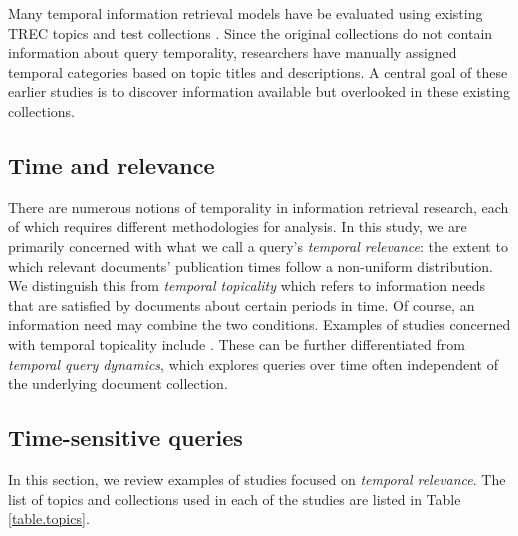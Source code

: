 \documentclass{asist}
\begin{document}
Many temporal information retrieval models have be evaluated using existing TREC topics and test collections \cite{Li2003, Jones2007, Efron2011, Dakka2012, Peetz2013a}. Since the original collections do not contain information about query temporality, researchers have manually assigned temporal categories  based on topic titles and descriptions.  A central goal of these earlier studies is to discover information available but overlooked in these existing collections.


\subsection{Time and relevance}

There are numerous notions of temporality in information retrieval research, each of which requires different methodologies for analysis. In this study, we are primarily concerned with what we call a query's \emph{temporal relevance}: the extent to which relevant documents' publication times follow a non-uniform distribution. We distinguish this from \emph{temporal topicality} which refers to information needs that are satisfied by documents about certain periods in time. Of course, an information need may combine the two conditions. Examples of studies concerned with temporal topicality include \cite{Berberich2010,Kanhabua2011}. These can be further differentiated from \emph{temporal query dynamics}, which explores  queries over time \cite{Shokouhi2011,Kulkarni2011} often independent of the underlying document collection.

\subsection{Time-sensitive queries}

In this section, we review examples of studies focused on \emph{temporal relevance}.  The list of topics and collections used in each of the studies are listed in Table \ref{table.topics}. 
\end{document}
